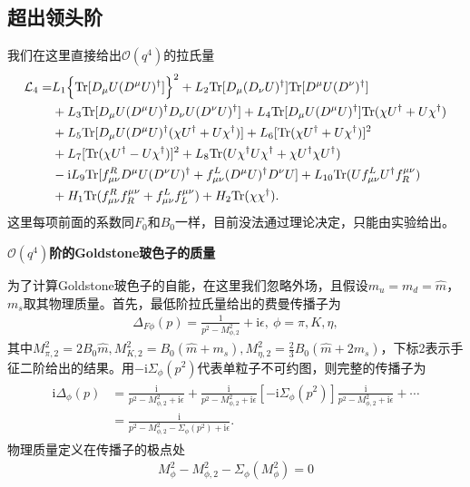 \documentclass[aps,tightenlines,16pt]{ctexart}
\numberwithin{equation}{section}
\newcommand{\mL}{\mathcal{L}}
\newcommand{\Tr}{\text{Tr}}
\begin{document}
\subsection{超出领头阶}
我们在这里直接给出$\mathcal{O}(q^4)$的拉氏量\cite{GASSER1985465}
\begin{align}
   \begin{aligned}
      \mL_4 = &L_1\Bigl\{\text{Tr}[D_{\mu}U(D^{\mu}U)^{\dagger}]\Bigr\}^2+L_2\text{Tr}[D_{\mu}(D_{\nu}U)^{\dagger}]\Tr[D^{\mu}U(D^{\nu})^{\dagger}]\\
      & +L_3\Tr[D_{\mu}U(D^{\mu}U)^{\dagger}D_{\nu}U(D^{\nu}U)^{\dagger}]+L_4\Tr[D_{\mu}U(D^{\mu}U)^{\dagger}]\Tr(\chi U^{\dagger}+U\chi^{\dagger})\\
      & +L_5\Tr[D_{\mu}U(D^{\mu}U)^{\dagger}(\chi U^{\dagger}+U\chi^{\dagger})]+L_6[\Tr(\chi U^{\dagger}+U\chi^{\dagger})]^2\\
      & +L_7[\Tr(\chi U^{\dagger}-U\chi^{\dagger})]^2+L_8\Tr(U\chi^{\dagger}U\chi^{\dagger}+\chi U^{\dagger}\chi U^{\dagger})\\
      & -\mbox{i}L_9\Tr[f_{\mu\nu}^R D^{\mu}U(D^{\nu}U)^{\dagger}+f_{\mu\nu}^L (D^{\mu}U)^{\dagger}D^{\nu}U]+L_{10}\Tr(Uf_{\mu\nu}^L U^{\dagger}f^{\mu\nu}_R)\\
      & +H_1\Tr(f_{\mu\nu}^Rf_R^{\mu\nu}+f_{\mu\nu}^Lf_L^{\mu\nu})+H_2\Tr(\chi\chi^{\dagger}).
   \end{aligned}
\end{align}
这里每项前面的系数同$F_0$和$B_0$一样，目前没法通过理论决定，只能由实验给出。

\textbf{$\mathcal{O}(q^4)$阶的Goldstone玻色子的质量}

为了计算Goldstone玻色子的自能，在这里我们忽略外场，且假设$m_u=m_d=\hat{m}$，$m_s$取其物理质量。首先，最低阶拉氏量给出的费曼传播子为
\begin{align}
   \Delta_{F\phi}(p)=\frac{1}{p^2-M_{\phi,2}^2}+\mbox{i}\epsilon,\ \phi = \pi,K,\eta,
\end{align}
其中$M_{\pi,2}^2=2B_0\hat{m},M_{K,2}^2=B_0(\hat{m}+m_s),M_{\eta,2}^2=\frac{2}{3}B_0(\hat{m}+2m_s)$，下标2表示手征二阶给出的结果。用$-\mbox{i}\Sigma_{\phi}(p^2)$代表单粒子不可约图，则完整的传播子为
\begin{align}
   \begin{aligned}
   \mbox{i}\Delta_{\phi}(p)&=\frac{\mbox{i}}{p^2-M^{2}_{\phi,2}+\mbox{i}\epsilon}+\frac{\mbox{i}}{p^2-M^{2}_{\phi,2}+\mbox{i}\epsilon}[-\mbox{i}\Sigma_{\phi}(p^2)]\frac{\mbox{i}}{p^2-M^{2}_{\phi,2}+\mbox{i}\epsilon}+\cdots\\
   &=\frac{\mbox{i}}{p^2-M^{2}_{\phi,2}-\Sigma_{\phi}(p^2)+\mbox{i}\epsilon}.
   \end{aligned}
\end{align}
物理质量定义在传播子的极点处
\begin{align}
   M_{\phi}^2 -M_{\phi,2}^2-\Sigma_{\phi}(M_{\phi}^2)=0
\end{align}
\end{document}
